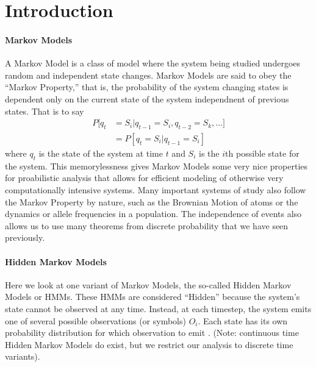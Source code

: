 \section{Introduction} \label{sec:intro}



\paragraph{Markov Models}
A Markov Model is a class of model where the system being studied undergoes random and independent state changes. Markov Models are said to obey the ``Markov Property,'' that is, the probability of the system changing states is dependent only on the current state of the system independnent of previous states. That is to say 
    \begin{align*}
      P[q_t &= S_i | q_{t-1} = S_i, q_{t-2} = S_k, ...]\\
      &= P[q_t = S_i | q_{t-1} = S_i]
    \end{align*}
where $q_t$ is the state of the system at time $t$ and $S_i$ is the $i$th possible state for the system. This memorylessness gives Markov Models some very nice properties for proabilistic analysis that allows for efficient modeling of otherwise very computationally intensive systems. Many important systems of study also follow the Markov Property by nature, such as the Brownian Motion of atoms or the dynamics or allele frequencies in a population. The independence of events also allows us to use many theorems from discrete probability that we have seen previously.

\paragraph{Hidden Markov Models}
Here we look at one variant of Markov Models, the so-called Hidden Markov Models or HMMs. These HMMs are considered ``Hidden'' because the system's state cannot be observed at any time. Instead, at each timestep, the system emits one of several possible observations (or symbols) $O_i$. Each state has its own probability distribution for which observation to emit \cite{Rabiner89}. (Note: continuous time Hidden Markov Models do exist, but we restrict our analysis to discrete time variants). 

